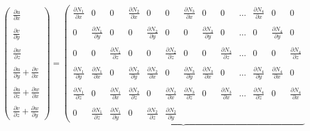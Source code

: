 \[
\left(
\begin{array}{c}
\frac{\partial u}{\partial x} \\ \\
\frac{\partial v}{\partial y} \\ \\
\frac{\partial w}{\partial z} \\ \\
\frac{\partial u}{\partial y} + \frac{\partial v}{\partial x} \\ \\
\frac{\partial u}{\partial z} + \frac{\partial w}{\partial x} \\ \\
\frac{\partial v}{\partial z} + \frac{\partial w}{\partial y} 
\end{array}
\right)
=
\underbrace{
\left(
\begin{array}{ccccccccccccc}
\frac{\partial N_1}{\partial x} & 0 & 0 &  
\frac{\partial N_2}{\partial x} & 0 & 0 &
\frac{\partial N_3}{\partial x} & 0 & 0 & \dots &
\frac{\partial N_4}{\partial x} & 0 & 0 \\  \\
0 & \frac{\partial N_1}{\partial y} & 0 &
0 & \frac{\partial N_2}{\partial y} & 0 &
0 & \frac{\partial N_3}{\partial y} & 0 & \dots &
0 & \frac{\partial N_4}{\partial y} & 0  \\ \\
0 & 0 & \frac{\partial N_1}{\partial z}  &
0 & 0 & \frac{\partial N_2}{\partial z}  &
0 & 0 & \frac{\partial N_3}{\partial z}  & \dots &
0 & 0 & \frac{\partial N_4}{\partial z}   \\ \\
\frac{\partial N_1}{\partial y} &  \frac{\partial N_1}{\partial x} & 0 &
\frac{\partial N_2}{\partial y} &  \frac{\partial N_2}{\partial x} & 0 &
\frac{\partial N_3}{\partial y} &  \frac{\partial N_3}{\partial x} & 0 & \dots &
\frac{\partial N_4}{\partial y} &  \frac{\partial N_4}{\partial x} & 0 \\ \\ 
\frac{\partial N_1}{\partial z} & 0 &\frac{\partial N_1}{\partial x}  &
\frac{\partial N_2}{\partial z} & 0 &\frac{\partial N_2}{\partial x}  &
\frac{\partial N_3}{\partial z} & 0 &\frac{\partial N_3}{\partial x}  & \dots &
\frac{\partial N_4}{\partial z} & 0 &\frac{\partial N_4}{\partial x}  \\ \\ 
0 & \frac{\partial N_1}{\partial z} &  \frac{\partial N_1}{\partial y}  &
0 & \frac{\partial N_2}{\partial z} &  \frac{\partial N_2}{\partial y}  &

\end{array}}\]
